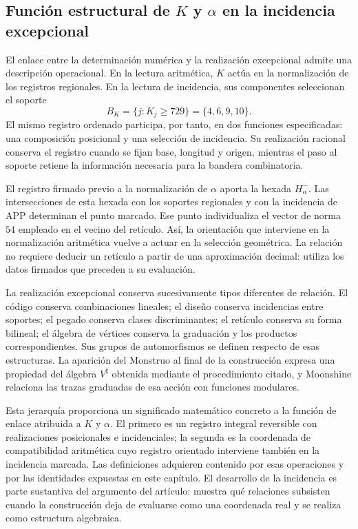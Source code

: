 \subsection{Función estructural de \texorpdfstring{\(K\) y \(\alpha\)}{K y alfa} en la incidencia excepcional}

El enlace entre la determinación numérica y la realización excepcional
admite una descripción operacional. En la lectura aritmética, \(K\)
actúa en la normalización de los registros regionales. En la lectura de
incidencia, sus componentes seleccionan el soporte
\[
 B_K=\{j:K_j\geq729\}=\{4,6,9,10\}.
\]
El mismo registro ordenado participa, por tanto, en dos funciones
especificadas: una composición posicional y una selección de incidencia.
Su realización racional conserva el registro cuando se fijan base,
longitud y origen, mientras el paso al soporte retiene la información
necesaria para la bandera combinatoria.

El registro firmado previo a la normalización de \(\alpha\) aporta
la hexada \(H_\alpha^-\). Las intersecciones de esta hexada con los
soportes regionales y con la incidencia de APP determinan el punto
marcado. Ese punto individualiza el vector de norma \(54\) empleado
en el vecino del retículo. Así, la orientación que interviene en la
normalización aritmética vuelve a actuar en la selección geométrica.
La relación no requiere deducir un retículo a partir de una aproximación
decimal: utiliza los datos firmados que preceden a su evaluación.

La realización excepcional conserva sucesivamente tipos diferentes de
relación. El código conserva combinaciones lineales; el diseño conserva
incidencias entre soportes; el pegado conserva clases discriminantes; el
retículo conserva su forma bilineal; el álgebra de vértices conserva la
graduación y los productos correspondientes. Sus grupos de automorfismos
se definen respecto de esas estructuras. La aparición del Monstruo al
final de la construcción expresa una propiedad del álgebra
\(V^\natural\) obtenida mediante el procedimiento citado, y Moonshine
relaciona las trazas graduadas de esa acción con funciones modulares.

Esta jerarquía proporciona un significado matemático concreto a la
función de enlace atribuida a \(K\) y \(\alpha\). El primero es un
registro integral reversible con realizaciones posicionales e
incidenciales; la segunda es la coordenada de compatibilidad aritmética
cuyo registro orientado interviene también en la incidencia marcada.
Las definiciones adquieren contenido por esas operaciones y por las
identidades expuestas en este capítulo. El desarrollo de la incidencia
es parte sustantiva del argumento del artículo: muestra qué relaciones
subsisten cuando la construcción deja de evaluarse como una coordenada
real y se realiza como estructura algebraica.
